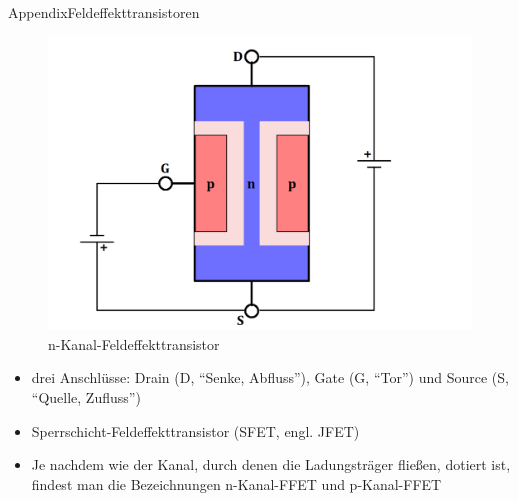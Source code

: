 \begin{frame}[allowframebreaks]{Appendix}{Feldeffekttransistoren}
  \begin{figure}
      \centering
      \includegraphics[height=0.5\textheight]{figures/n-Kanal-Feldeffekttransistor.png}
      \caption{n-Kanal-Feldeffekttransistor}
  \end{figure}
  \begin{itemize}
    \item \alert{drei Anschlüsse:} Drain (D, \enquote{Senke, Abfluss}), Gate (G, \enquote{Tor}) und Source (S, \enquote{Quelle, Zufluss})
    \item Sperrschicht-Feldeffekttransistor (SFET, engl. JFET)
    \item Je nachdem wie der Kanal, durch denen die Ladungsträger fließen, dotiert ist, findest man die Bezeichnungen n-Kanal-FFET und p-Kanal-FFET
  \end{itemize}
\end{frame}


